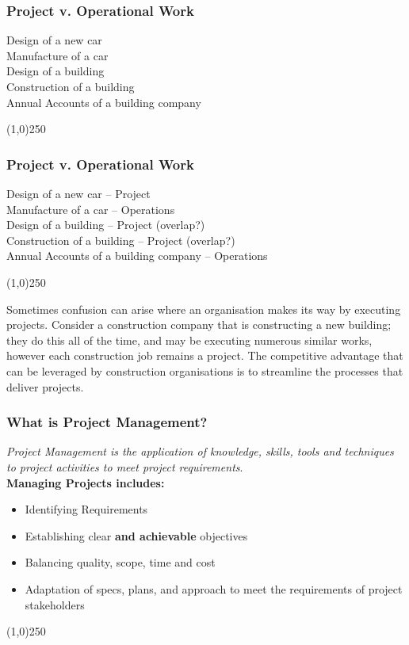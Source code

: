 \begin{frame}
\frametitle{Project v. Operational Work}
Design of a new car\\
Manufacture of a car\\
Design of a building\\
Construction of a building\\
Annual Accounts of a building company\\
\end{frame}
\begin{center}\line(1,0){250}\end{center}



\begin{frame}
\frametitle{Project v. Operational Work}
Design of a new car -- Project\\
Manufacture of a car -- Operations \\
Design of a building -- Project (overlap?)\\
Construction of a building -- Project (overlap?)\\
Annual Accounts of a building company -- Operations\\
\end{frame}
\begin{center}\line(1,0){250}\end{center}
Sometimes confusion can arise where an organisation makes its way by executing projects.  Consider a construction company that is constructing a new building; they do this all of the time, and may be executing numerous similar works, however each construction job remains a project.  The competitive advantage that can be leveraged by construction organisations is to streamline the processes that deliver projects.  




\begin{frame}
\frametitle{What is Project Management?}
\textit{Project Management is the application of knowledge, skills, tools and techniques to project activities to meet project requirements}.\\
\textbf{Managing Projects includes:}\\
\begin{itemize}
	\item Identifying Requirements
	\item Establishing clear \textbf{and achievable} objectives
	\item Balancing quality, scope, time and cost
	\item Adaptation of specs, plans, and approach to meet the requirements of project stakeholders
\end{itemize}
\end{frame}
\begin{center}\line(1,0){250}\end{center}




